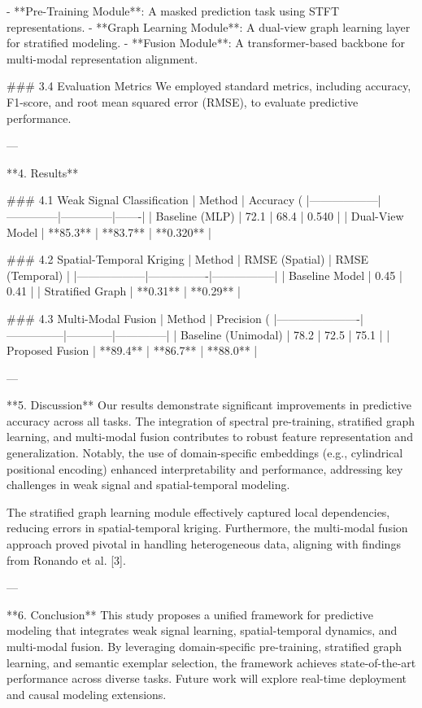 - **Pre-Training Module**: A masked prediction task using STFT representations.  
- **Graph Learning Module**: A dual-view graph learning layer for stratified modeling.  
- **Fusion Module**: A transformer-based backbone for multi-modal representation alignment.  

### 3.4 Evaluation Metrics  
We employed standard metrics, including accuracy, F1-score, and root mean squared error (RMSE), to evaluate predictive performance.

---

**4. Results**  

### 4.1 Weak Signal Classification  
| Method          | Accuracy (%
|------------------|--------------|--------------|-------|  
| Baseline (MLP)   | 72.1         | 68.4         | 0.540 |  
| Dual-View Model  | **85.3**     | **83.7**     | **0.320** |  

### 4.2 Spatial-Temporal Kriging  
| Method          | RMSE (Spatial) | RMSE (Temporal) |  
|------------------|----------------|-----------------|  
| Baseline Model   | 0.45           | 0.41            |  
| Stratified Graph | **0.31**       | **0.29**        |  

### 4.3 Multi-Modal Fusion  
| Method              | Precision (%
|----------------------|---------------|------------|--------------|  
| Baseline (Unimodal)  | 78.2          | 72.5       | 75.1         |  
| Proposed Fusion      | **89.4**      | **86.7**   | **88.0**     |  

---

**5. Discussion**  
Our results demonstrate significant improvements in predictive accuracy across all tasks. The integration of spectral pre-training, stratified graph learning, and multi-modal fusion contributes to robust feature representation and generalization. Notably, the use of domain-specific embeddings (e.g., cylindrical positional encoding) enhanced interpretability and performance, addressing key challenges in weak signal and spatial-temporal modeling.  

The stratified graph learning module effectively captured local dependencies, reducing errors in spatial-temporal kriging. Furthermore, the multi-modal fusion approach proved pivotal in handling heterogeneous data, aligning with findings from Ronando et al. [3].  

---

**6. Conclusion**  
This study proposes a unified framework for predictive modeling that integrates weak signal learning, spatial-temporal dynamics, and multi-modal fusion. By leveraging domain-specific pre-training, stratified graph learning, and semantic exemplar selection, the framework achieves state-of-the-art performance across diverse tasks. Future work will explore real-time deployment and causal modeling extensions.  


